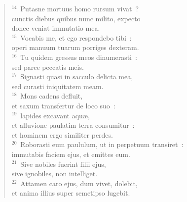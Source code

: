 \begin{flushleft}
\begin{verse}
${}^{14}$~Putasne mortuus homo rursum vivat~?\\ cunctis diebus quibus nunc milito, expecto\\ donec veniat immutatio mea.\\
${}^{15}$~Vocabis me, et ego respondebo tibi~:\\ operi manuum tuarum porriges dexteram.\\
${}^{16}$~Tu quidem gressus meos dinumerasti~:\\ sed parce peccatis meis.\\
${}^{17}$~Signasti quasi in sacculo delicta mea,\\ sed curasti iniquitatem meam.\\
${}^{18}$~Mons cadens defluit,\\ et saxum transfertur de loco suo~:\\
${}^{19}$~lapides excavant aqu\ae ,\\ et alluvione paulatim terra consumitur~:\\ et hominem ergo similiter perdes.\\
${}^{20}$~Roborasti eum paululum, ut in perpetuum transiret~:\\ immutabis faciem ejus, et emittes eum.\\
${}^{21}$~Sive nobiles fuerint filii ejus,\\ sive ignobiles, non intelliget.\\
${}^{22}$~Attamen caro ejus, dum vivet, dolebit,\\ et anima illius super semetipso lugebit.\end{verse}\end{flushleft}



